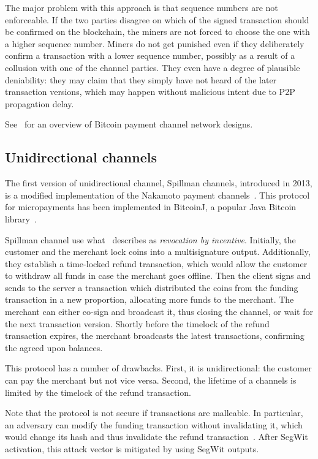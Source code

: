 The major problem with this approach is that sequence numbers are not enforceable.
If the two parties disagree on which of the signed transaction should be confirmed on the blockchain, the miners are not forced to choose the one with a higher sequence number.
Miners do not get punished even if they deliberately confirm a transaction with a lower sequence number, possibly as a result of a collusion with one of the channel parties.
They even have a degree of plausible deniability: they may claim that they simply have not heard of the later transaction versions, which may happen without malicious intent due to P2P propagation delay.

See~\cite{McCorry2016} for an overview of Bitcoin payment channel network designs.


\subsection{Unidirectional channels}

The first version of unidirectional channel, Spillman channels, introduced in 2013, is a modified implementation of the Nakamoto payment channels~\cite{Spillman2013}.
This protocol for micropayments has been implemented in BitcoinJ, a popular Java Bitcoin library~\cite{BitcoinJ}.

Spillman channel use what~\cite{Gudgeon2019} describes as \textit{revocation by incentive}.
Initially, the customer and the merchant lock coins into a multisignature output.
Additionally, they establish a time-locked refund transaction, which would allow the customer to withdraw all funds in case the merchant goes offline.
Then the client signs and sends to the server a transaction which distributed the coins from the funding transaction in a new proportion, allocating more funds to the merchant.
The merchant can either co-sign and broadcast it, thus closing the channel, or wait for the next transaction version.
Shortly before the timelock of the refund transaction expires, the merchant broadcasts the latest transactions, confirming the agreed upon balances.

This protocol has a number of drawbacks.
First, it is unidirectional: the customer can pay the merchant but not vice versa.
Second, the lifetime of a channels is limited by the timelock of the refund transaction.

Note that the protocol is not secure if transactions are malleable.
In particular, an adversary can modify the funding transaction without invalidating it, which would change its hash and thus invalidate the refund transaction~\cite{Harding2016}.
After SegWit activation, this attack vector is mitigated by using SegWit outputs.

